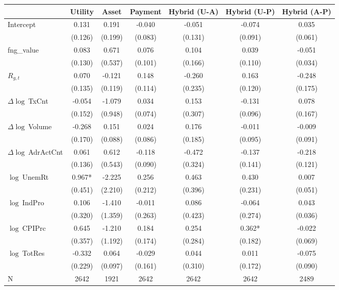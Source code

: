 \begin{table}[ht]
\centering
\scriptsize
\setlength{\tabcolsep}{4pt}
\begin{tabular}{l *{6}{c}}
\toprule
 & Utility & Asset & Payment & Hybrid (U-A) & Hybrid (U-P) & Hybrid (A-P) \\
\midrule
Intercept & 0.131 & 0.191 & -0.040 & -0.051 & -0.074 & 0.035 \\
 & (0.126) & (0.199) & (0.083) & (0.131) & (0.091) & (0.061) \\
\addlinespace
fng_value & 0.083 & 0.671 & 0.076 & 0.104 & 0.039 & -0.051 \\
 & (0.130) & (0.537) & (0.101) & (0.166) & (0.110) & (0.034) \\
\addlinespace
$R_{g,t}$ & 0.070 & -0.121 & 0.148 & -0.260 & 0.163 & -0.248 \\
 & (0.135) & (0.119) & (0.114) & (0.235) & (0.120) & (0.175) \\
\addlinespace
$\Delta\log\ $TxCnt & -0.054 & -1.079 & 0.034 & 0.153 & -0.131 & 0.078 \\
 & (0.152) & (0.948) & (0.074) & (0.307) & (0.096) & (0.167) \\
\addlinespace
$\Delta\log\ $Volume & -0.268 & 0.151 & 0.024 & 0.176 & -0.011 & -0.009 \\
 & (0.170) & (0.088) & (0.086) & (0.185) & (0.095) & (0.091) \\
\addlinespace
$\Delta\log\ $AdrActCnt & 0.061 & 0.612 & -0.118 & -0.472 & -0.137 & -0.218 \\
 & (0.136) & (0.543) & (0.090) & (0.324) & (0.141) & (0.121) \\
\addlinespace
$\log\ $UnemRt & 0.967* & -2.225 & 0.256 & 0.463 & 0.430 & 0.007 \\
 & (0.451) & (2.210) & (0.212) & (0.396) & (0.231) & (0.051) \\
\addlinespace
$\log\ $IndPro & 0.106 & -1.410 & -0.011 & 0.086 & -0.064 & 0.043 \\
 & (0.320) & (1.359) & (0.263) & (0.423) & (0.274) & (0.036) \\
\addlinespace
$\log\ $CPIPrc & 0.645 & -1.210 & 0.184 & 0.254 & 0.362* & -0.022 \\
 & (0.357) & (1.192) & (0.174) & (0.284) & (0.182) & (0.069) \\
\addlinespace
$\log\ $TotRes & -0.332 & 0.064 & -0.029 & 0.044 & 0.011 & -0.075 \\
 & (0.229) & (0.097) & (0.161) & (0.310) & (0.172) & (0.090) \\
\addlinespace
\midrule
N & 2642 & 1921 & 2642 & 2642 & 2642 & 2489 \\

\end{tabular}
\end{table}
